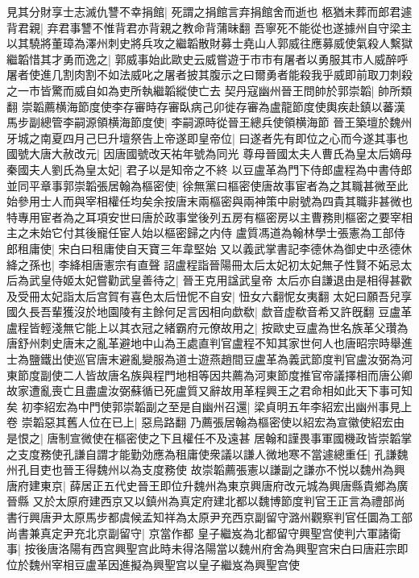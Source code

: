 見其分財享士志滅仇讐不幸捐館|{
	死謂之捐館言弃捐館舍而逝也}
柩猶未葬而郎君遽背君親|{
	弃君事讐不惟背君亦背親之教命背蒲昧翻}
吾寧死不能從也遂據州自守梁主以其驍將董璋為澤州刺史將兵攻之繼韜散財募士堯山人郭威往應募威使氣殺人繫獄繼韜惜其才勇而逸之|{
	郭威事始此歐史云威嘗遊于市市有屠者以勇服其市人威醉呼屠者使進几割肉割不如法威叱之屠者披其腹示之曰爾勇者能殺我乎威即前取刀刺殺之一市皆驚而威自如為吏所執繼韜縱使亡去}
契丹寇幽州晉王問帥於郭崇韜|{
	帥所類翻}
崇韜薦横海節度使李存審時存審臥病己卯徙存審為盧龍節度使輿疾赴鎮以蕃漢馬步副總管李嗣源領横海節度使|{
	李嗣源時從晉王總兵使領横海節}
晉王築壇於魏州牙城之南夏四月己巳升壇祭告上帝遂即皇帝位|{
	曰遂者先有即位之心而今遂其事也}
國號大唐大赦改元|{
	因唐國號改天祐年號為同光}
尊母晉國太夫人曹氏為皇太后嫡母秦國夫人劉氏為皇太妃|{
	君子以是知帝之不終}
以豆盧革為門下侍郎盧程為中書侍郎並同平章事郭崇韜張居翰為樞密使|{
	徐無黨曰樞密使唐故事宦者為之其職甚微至此始參用士人而與宰相權任均矣余按唐末兩樞密與兩神策中尉號為四貴其職非甚微也特專用宦者為之耳項安世曰唐於政事堂後列五房有樞密房以主曹務則樞密之要宰相主之未始它付其後寵任宦人始以樞密歸之内侍}
盧質馮道為翰林學士張憲為工部侍郎租庸使|{
	宋白曰租庸使自天寶三年韋堅始}
又以義武掌書記李德休為御史中丞德休絳之孫也|{
	李絳相唐憲宗有直聲}
詔盧程詣晉陽冊太后太妃初太妃無子性賢不妬忌太后為武皇侍姬太妃嘗勸武皇善待之|{
	晉王克用諡武皇帝}
太后亦自謙退由是相得甚歡及受冊太妃詣太后宫賀有喜色太后忸怩不自安|{
	忸女六翻怩女夷翻}
太妃曰願吾兒享國久長吾輩獲沒於地園陵有主餘何足言因相向歔欷|{
	歔音虚欷音希又許旣翻}
豆盧革盧程皆輕淺無它能上以其衣冠之緒霸府元僚故用之|{
	按歐史豆盧為世名族革父瓚為唐舒州刺史唐末之亂革避地中山為王處直判官盧程不知其家世何人也唐昭宗時舉進士為鹽鐵出使巡官唐末避亂變服為道士遊燕趙間豆盧革為義武節度判官盧汝弼為河東節度副使二人皆故唐名族與程門地相等因共薦為河東節度推官帝議擇相而唐公卿故家遭亂喪亡且盡盧汝弼蘇循已死盧質又辭故用革程興王之君命相如此天下事可知矣}
初李紹宏為中門使郭崇韜副之至是自幽州召還|{
	梁貞明五年李紹宏出幽州事見上卷}
崇韜惡其舊人位在已上|{
	惡烏路翻}
乃薦張居翰為樞密使以紹宏為宣徽使紹宏由是恨之|{
	唐制宣微使在樞密使之下且權任不及遠甚}
居翰和謹畏事軍國機政皆崇韜掌之支度務使孔謙自謂才能勤効應為租庸使衆議以謙人微地寒不當遽總重任|{
	孔謙魏州孔目吏也晉王得魏州以為支度務使}
故崇韜薦張憲以謙副之謙亦不悦以魏州為興唐府建東京|{
	薛居正五代史晉王即位升魏州為東京興唐府改元城為興唐縣貴鄉為廣晉縣}
又於太原府建西京又以鎮州為真定府建北都以魏博節度判官王正言為禮部尚書行興唐尹太原馬步都虞候孟知祥為太原尹充西京副留守潞州觀察判官任圜為工部尚書兼真定尹充北京副留守|{
	京當作都}
皇子繼岌為北都留守興聖宫使判六軍諸衛事|{
	按後唐洛陽有西宫興聖宫此時未得洛陽當以魏州府舍為興聖宫宋白曰唐莊宗即位於魏州宰相豆盧革因進擬為興聖宫以皇子繼岌為興聖宫使}
